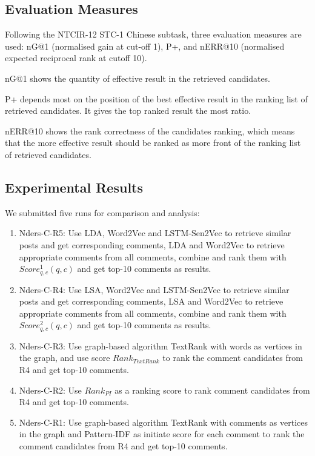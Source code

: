\documentclass{sig-alternate}
\begin{document}
\subsection{Evaluation Measures}
Following the NTCIR-12 STC-1 Chinese subtask, three evaluation measures are
used: nG@1 (normalised gain at cut-off 1), P+, and nERR@10 (normalised expected reciprocal rank at cutoff 10)\cite{Lifeng}\cite{Lifeng-13}.

nG@1 shows the quantity of effective result in the retrieved candidates. 

P+ depends most on the position of the best effective result in the
ranking list of retrieved candidates. It gives the top ranked result
the most ratio. 

nERR@10 shows the rank correctness of the candidates ranking,
which means that the more effective result should be ranked as
more front of the ranking list of retrieved candidates.

\subsection{Experimental Results}
We submitted five runs for comparison and analysis:

\begin{enumerate}
  \item{Nders-C-R5: } Use LDA, Word2Vec and LSTM-Sen2Vec to retrieve similar posts 
  and get corresponding comments, LDA and Word2Vec to retrieve appropriate comments 
  from all comments, combine and rank them with $Score_{q,c}^1(q, c)$ and get top-10 comments as results.
  \item{Nders-C-R4: } Use LSA, Word2Vec and LSTM-Sen2Vec to retrieve similar posts 
  and get corresponding comments, LSA and Word2Vec to retrieve appropriate comments 
  from all comments, combine and rank them with $Score_{q,c}^2(q, c)$ and  get top-10 comments as results.
  \item{Nders-C-R3: } Use graph-based algorithm TextRank with words as vertices
  in the graph, and use score $Rank_{TextRank}$ to rank the comment candidates 
  from R4 and get top-10 comments.
  \item{Nders-C-R2: } Use $Rank_{PI}$ as a ranking score to rank comment 
  candidates from R4 and get top-10 comments.
  \item{Nders-C-R1: } Use graph-based algorithm TextRank with comments as 
  vertices in the graph and Pattern-IDF as initiate score for each comment to 
  rank the comment candidates from R4 and get top-10 comments.
\end{enumerate}
\end{document}
